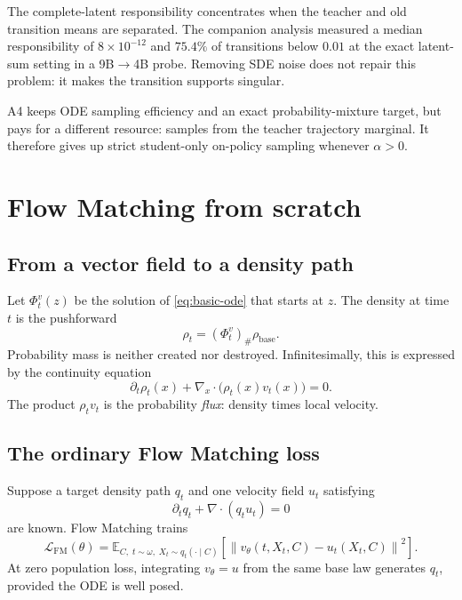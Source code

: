 \documentclass[11pt,a4paper]{article}
\newcommand{\E}{\mathbb{E}}
\newcommand{\norm}[1]{\left\lVert #1 \right\rVert}
\newcommand{\vtheta}{v_\theta}
\theoremstyle{plain}
\theoremstyle{definition}
\begin{document}
The complete-latent responsibility concentrates when the teacher and old transition means are
separated.
The companion analysis
 measured a median responsibility of
$8\times10^{-12}$ and $75.4\%$ of transitions below $0.01$ at the exact latent-sum setting in a
9B$\to$4B probe.  Removing SDE noise does not repair this problem: it makes the transition
supports singular.

A4 keeps ODE sampling efficiency and an exact probability-mixture target, but pays for a
different resource: samples from the teacher trajectory marginal.  It therefore gives up strict
student-only on-policy sampling whenever $\alpha>0$.

\section{Flow Matching from scratch}
\label{sec:fm}

\subsection{From a vector field to a density path}

Let $\Phi_t^v(z)$ be the solution of \eqref{eq:basic-ode} that starts at $z$.  The density at
time $t$ is the pushforward
\begin{equation}
\rho_t=(\Phi_t^v)_\#\rho_{\mathrm{base}}.
\label{eq:pushforward}
\end{equation}
Probability mass is neither created nor destroyed.  Infinitesimally, this is expressed by the
continuity equation
\begin{equation}
\partial_t\rho_t(x)+\nabla_x\!\cdot\!\bigl(\rho_t(x)v_t(x)\bigr)=0.
\label{eq:continuity}
\end{equation}
The product $\rho_tv_t$ is the probability \emph{flux}: density times local velocity.

\subsection{The ordinary Flow Matching loss}

Suppose a target density path $q_t$ and one velocity field $u_t$ satisfying
\begin{equation}
\partial_tq_t+\nabla\!\cdot(q_tu_t)=0
\label{eq:target-continuity}
\end{equation}
are known.  Flow Matching trains
\begin{equation}
\mathcal L_{\mathrm{FM}}(\theta)
=
\E_{C,\;t\sim\omega,\;X_t\sim q_t(\cdot\mid C)}
\left[
  \norm{\vtheta(t,X_t,C)-u_t(X_t,C)}^2
\right].
\label{eq:fm-loss}
\end{equation}
At zero population loss, integrating $\vtheta=u$ from the same base law generates $q_t$,
provided the ODE is well posed.
\end{document}
